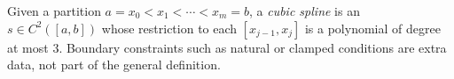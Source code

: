 
Given a partition $a=x_0<x_1<\cdots<x_m=b$, a \emph{cubic spline} is an $s\in C^2([a,b])$ whose restriction to each $[x_{j-1},x_j]$ is a polynomial of degree at most $3$. Boundary constraints such as natural or clamped conditions are extra data, not part of the general definition.
